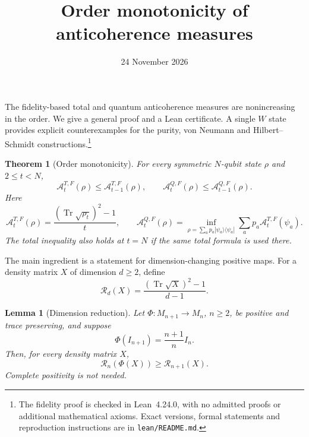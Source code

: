 \documentclass[11pt]{article}
\title{Order monotonicity of anticoherence measures}
\author{}\date{24 November 2026}
\newtheorem{theorem}{Theorem}
\newtheorem{lemma}{Lemma}
\newcommand{\Tr}{\operatorname{Tr}}
\newcommand{\A}{\mathcal A}
\newcommand{\R}{\mathcal R}
\begin{document}
\maketitle
\noindent
The fidelity-based total and quantum anticoherence measures are nonincreasing in the order. We give a general proof and a Lean certificate. A single $W$ state provides explicit counterexamples for the purity, von Neumann and Hilbert--Schmidt constructions.\footnote{The fidelity proof is checked in Lean~4.24.0, with no admitted proofs or additional mathematical axioms. Exact versions, formal statements and reproduction instructions are in \texttt{lean/README.md}.}

\begin{theorem}[Order monotonicity]
For every symmetric $N$-qubit state $\rho$ and $2\le t<N$,
\begin{equation}\label{eq:main}
 \A_t^{T,F}(\rho)\le \A_{t-1}^{T,F}(\rho),\qquad
 \A_t^{Q,F}(\rho)\le \A_{t-1}^{Q,F}(\rho).
\end{equation}
Here
\[
 \A_t^{T,F}(\rho)=\frac{(\Tr\sqrt{\rho_t})^2-1}{t},\qquad
 \A_t^{Q,F}(\rho)=\inf_{\rho=\sum_a p_a|\psi_a\rangle\langle\psi_a|}
 \sum_a p_a\A_t^{T,F}(\psi_a).
\]
The total inequality also holds at $t=N$ if the same total formula is used there.
\end{theorem}

\noindent The main ingredient is a statement for dimension-changing positive maps. For a density matrix $X$ of dimension $d\ge2$, define
\[
 \R_d(X)=\frac{(\Tr\sqrt X)^2-1}{d-1}.
\]

\begin{lemma}[Dimension reduction]\label{lem:map}
Let $\Phi:M_{n+1}\to M_n$, $n\ge2$, be positive and trace preserving, and suppose
\begin{equation}\label{eq:scalar}
 \Phi(I_{n+1})=\frac{n+1}{n}I_n.
\end{equation}
Then, for every density matrix $X$,
\begin{equation}\label{eq:general}
 \R_n(\Phi(X))\ge \R_{n+1}(X).
\end{equation}
Complete positivity is not needed.
\end{lemma}
\end{document}
